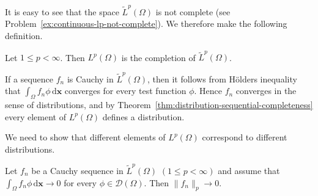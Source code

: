 It is easy to see that the space $\widetilde L^p(\Omega)$ is not complete (see Problem~\ref{ex:continuous-lp-not-complete}). We therefore make the following definition.

\begin{Definition}
\label{def:lp-space-completion}
Let $1\leq p<\infty$. Then $L^p(\Omega)$ is the completion of $\widetilde L^p(\Omega)$.
\end{Definition}

\begin{Remark}
\label{rem:lp-completion-defines-distributions}
If a sequence $f_n$ is Cauchy in $\widetilde L^p(\Omega)$, then it follows from Hölder\textquotesingle s inequality that $\int_\Omega f_n\phi\,\mathrm{d}\bm{x}$ converges for every test function $\phi$. Hence $f_n$ converges in the sense of distributions, and by Theorem~\ref{thm:distribution-sequential-completeness} every element of $L^p(\Omega)$ defines a distribution.
\end{Remark}

We need to show that different elements of $L^p(\Omega)$ correspond to different distributions.

\begin{Lemma}
\label{lem:lp-completion-faithful-distribution-inclusion}
Let $f_n$ be a Cauchy sequence in $\widetilde L^p(\Omega)$ $(1\leq p<\infty)$ and assume that $\int_\Omega f_n\phi\,\mathrm{d}\bm{x}\to0$ for every $\phi\in\mathcal{D}(\Omega)$. Then $\|f_n\|_p\to0$.
\end{Lemma}

